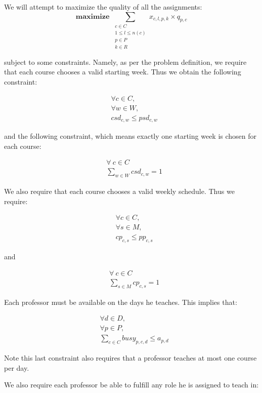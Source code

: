 We will attempt to maximize the quality of all the assignments:
$$
\textbf{maximize } \sum_{\substack{c \in C\\1 \le l \le n(c)\\p \in P\\k \in R}} x_{c, l, p, k} \times q_{p, c}
$$

subject to some constraints. Namely, as per the problem definition, we require that each course chooses a valid starting week. Thus we obtain the following constraint:

\begin{align}
  &\forall c \in C,\\
  &\forall w \in W,\\
  &csd_{c, w} \le psd_{c, w}
\end{align}

and the following constraint, which means exactly one starting week is chosen for each course:

\begin{align} \label{eq:chosenstart}
  &\forall\ c \in C\\
  &\sum_{w \in W} csd_{c, w} = 1
\end{align}

We also require that each course chooses a valid weekly schedule. Thus we require:

\begin{align}
  &\forall c \in C,\\
  &\forall s \in M,\\
  &cp_{c, s} \le pp_{c, s}
\end{align}

and

\begin{align} \label{eq:chosenpattern}
  &\forall\ c \in C\\
  &\sum_{s \in M} cp_{c, s} = 1
\end{align}

Each professor must be available on the days he teaches. This implies that:

\begin{align}
  &\forall d \in D,\\
  &\forall p \in P,\\
  &\sum_{c \in C} busy_{p, c, d} \le a_{p, d}
\end{align}

Note this last constraint also requires that a professor teaches at most one course per day.

We also require each professor be able to fulfill any role he is assigned to teach in:

